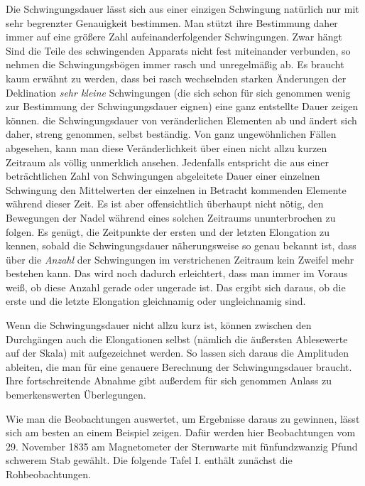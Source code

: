 Die Schwingungsdauer lässt sich aus einer einzigen Schwingung natürlich nur mit sehr begrenzter Genauigkeit bestimmen. Man stützt ihre Bestimmung daher immer auf eine größere Zahl aufeinanderfolgender Schwingungen. Zwar hängt
\expandafter\def\csname HistoricalNoteText391\endcsname{Sind die Teile des schwingenden Apparats nicht fest miteinander verbunden, so nehmen die Schwingungsbögen immer rasch und unregelmäßig ab.}
\expandafter\def\csname HistoricalNoteText382\endcsname{Es braucht kaum erwähnt zu werden, dass bei rasch wechselnden starken Änderungen der Deklination \textit{sehr kleine} Schwingungen (die sich schon für sich genommen wenig zur Bestimmung der Schwingungsdauer eignen) eine ganz entstellte Dauer zeigen können.}
die Schwingungsdauer von veränderlichen Elementen ab und ändert sich daher, streng genommen, selbst beständig. Von ganz ungewöhnlichen Fällen abgesehen, kann man diese Veränderlichkeit über einen nicht allzu kurzen Zeitraum als völlig unmerklich ansehen. Jedenfalls entspricht die aus einer beträchtlichen Zahl von Schwingungen abgeleitete Dauer einer einzelnen Schwingung den Mittelwerten der einzelnen in Betracht kommenden Elemente während dieser Zeit. Es ist aber offensichtlich überhaupt nicht nötig, den Bewegungen der Nadel während eines solchen Zeitraums ununterbrochen zu folgen. Es genügt, die Zeitpunkte der ersten und der letzten Elongation zu kennen, sobald die Schwingungsdauer näherungsweise so genau bekannt ist, dass über die \textit{Anzahl} der Schwingungen im verstrichenen Zeitraum kein Zweifel mehr bestehen kann. Das wird noch dadurch erleichtert, dass man immer im Voraus weiß, ob diese Anzahl gerade oder ungerade ist. Das ergibt sich daraus, ob die erste und die letzte Elongation gleichnamig oder ungleichnamig sind.

Wenn die Schwingungsdauer nicht allzu kurz ist, können zwischen den Durchgängen auch die Elongationen selbst (nämlich die äußersten Ablesewerte auf der Skala) mit aufgezeichnet werden. So lassen sich daraus die Amplituden ableiten, die man für eine genauere Berechnung der Schwingungsdauer braucht. Ihre fortschreitende Abnahme gibt außerdem für sich genommen Anlass zu bemerkenswerten Überlegungen.

Wie man die Beobachtungen auswertet, um Ergebnisse daraus zu gewinnen, lässt sich am besten an einem Beispiel zeigen. Dafür werden hier Beobachtungen vom 29. November 1835 am Magnetometer der Sternwarte mit fünfundzwanzig Pfund schwerem Stab gewählt. Die folgende Tafel I. enthält zunächst die Rohbeobachtungen.

